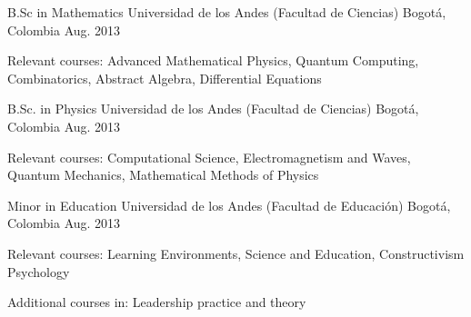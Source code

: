 \begin{cventries}
  \cventry
    {B.Sc in Mathematics}
    {Universidad de los Andes (Facultad de Ciencias)}
    {Bogotá, Colombia}
    {Aug. 2013}
    {
      \begin{cvitems}
        \item {Relevant courses: Advanced Mathematical Physics, Quantum Computing, Combinatorics, Abstract Algebra, Differential Equations}
      \end{cvitems}
    }
    \cventry
    {B.Sc. in Physics}
    {Universidad de los Andes (Facultad de Ciencias)}
    {Bogotá, Colombia}
    {Aug. 2013}
    {
        \begin{cvitems}
            \item {Relevant courses: Computational Science, Electromagnetism and Waves, Quantum Mechanics, Mathematical Methods of Physics}
        \end{cvitems}
    }
    \cventry
    {Minor in Education}
    {Universidad de los Andes (Facultad de Educación)}
    {Bogotá, Colombia}
    {Aug. 2013}
    {
        \begin{cvitems}
            \item{ Relevant courses: Learning Environments, Science and Education, Constructivism Psychology}
            \item{ Additional courses in: Leadership practice and theory }
        \end{cvitems}
    }
\end{cventries}
